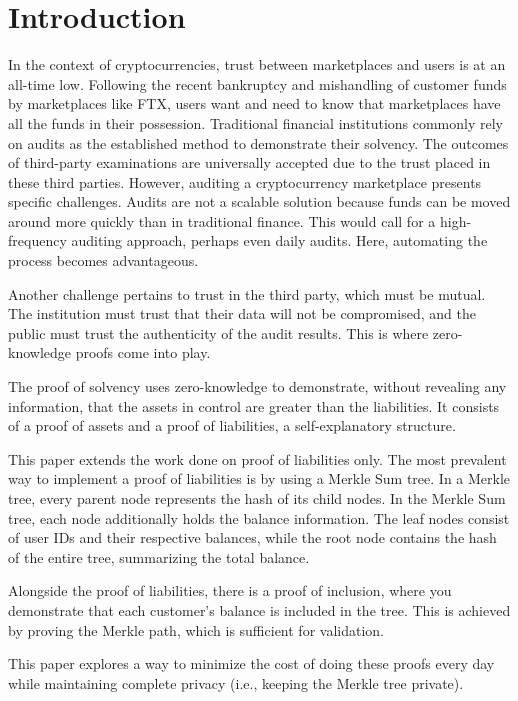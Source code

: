 
\chapter{Introduction}

In the context of cryptocurrencies, trust between marketplaces and users is at an all-time low. Following the recent bankruptcy and mishandling of customer funds by marketplaces like FTX, users want and need to know that marketplaces have all the funds in their possession. 
Traditional financial institutions commonly rely on audits as the established method to demonstrate their solvency. The outcomes of third-party examinations are universally accepted due to the trust placed in these third parties. However, auditing a cryptocurrency marketplace presents specific challenges. 
Audits are not a scalable solution because funds can be moved around more quickly than in traditional finance. This would call for a high-frequency auditing approach, perhaps even daily audits. Here, automating the process becomes advantageous.

Another challenge pertains to trust in the third party, which must be mutual. The institution must trust that their data will not be compromised, and the public must trust the authenticity of the audit results. This is where zero-knowledge proofs come into play. 

The proof of solvency uses zero-knowledge to demonstrate, without revealing any information, that the assets in control are greater than the liabilities. It consists of a proof of assets and a proof of liabilities, a self-explanatory structure.

This paper extends the work done on proof of liabilities only. The most prevalent way to implement a proof of liabilities is by using a Merkle Sum tree. 
In a Merkle tree, every parent node represents the hash of its child nodes. In the Merkle Sum tree, each node additionally holds the balance information. The leaf nodes consist of user IDs and their respective balances, while the root node contains the hash of the entire tree, summarizing the total balance.

Alongside the proof of liabilities, there is a proof of inclusion, where you demonstrate that each customer's balance is included in the tree. This is achieved by proving the Merkle path, which is sufficient for validation.

This paper explores a way to minimize the cost of doing these proofs every day while maintaining complete privacy (i.e., keeping the Merkle tree private).


